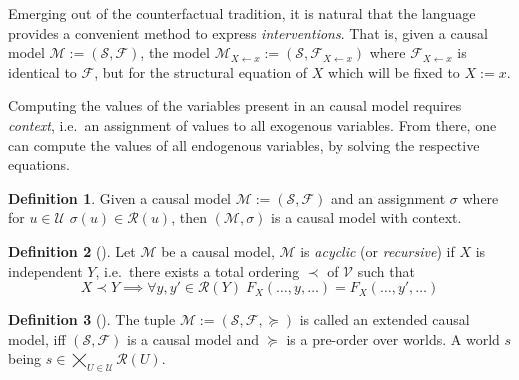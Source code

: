 \documentclass[11pt,a4paper]{book}
\theoremstyle{definition}
\newtheorem{definition}{Definition}[section]
\theoremstyle{definition}
\theoremstyle{definition}
\theoremstyle{remark}
\newcommand{\cmodel}{\mathcal{M}}
\newcommand{\csig}{\mathcal{S}}
\newcommand{\cfoos}{\mathcal{F}}
\newcommand{\crange}{\mathcal{R}}
\newcommand{\cenvars}{\mathcal{V}}
\newcommand{\cexvars}{\mathcal{U}}
\begin{document}
Emerging out of the counterfactual tradition, it is natural that the language provides a convenient method to express \emph{interventions}. That is, given a causal model $\cmodel:=(\csig, \cfoos)$, the model $\cmodel_{X \leftarrow x}:=(\csig, \cfoos_{X \leftarrow x})$ where $\cfoos_{X \leftarrow x}$ is identical to $\cfoos$, but for the structural equation of $X$ which will be fixed to $X:=x$.


Computing the values of the variables present in an causal model requires \emph{context}, i.e.\ an assignment of values to all exogenous variables. From there, one can compute the values of all endogenous variables, by solving the respective equations.

\begin{definition}
Given a causal model $\cmodel:=(\csig, \cfoos)$ and an assignment $\sigma$ where for $u \in \cexvars$ $\sigma(u) \in \crange(u)$, then $(\cmodel, \sigma)$ is a causal model with context.
\end{definition}


\begin{definition}[\cite{halpern2015cause}]
Let $\cmodel$ be a causal model, $\cmodel$ is \emph{acyclic} (or \emph{recursive}) if $X$ is independent $Y$, i.e.\ there exists a total ordering $\prec$ of $\cenvars$ such that
\begin{equation*}
 X \prec Y \implies  \forall y,y' \in \crange(Y) \; F_X(\dots , y, \dots) = F_X(\dots , y', \dots) 
\end{equation*}
\end{definition}



\begin{definition}[\cite{halpern2015cause}]
The tuple $\cmodel:= (\csig, \cfoos, \succeq)$ is called an extended causal model, iff $(\csig, \cfoos)$ is a causal model and $\succeq$ is a pre-order over worlds. A
world $s$ being $s \in   \bigtimes_{U \in \cexvars} \crange(U)$.
\end{definition}


\end{document}
